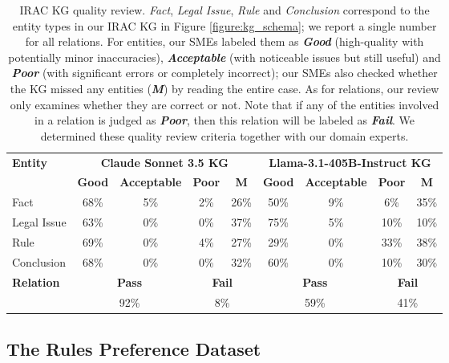 \begin{table}[ht]
  \centering
  \begin{tabular}{l|cccc|cccc}
    \hline
   \multirow{2}{*}{\textbf{Entity}} & \multicolumn{4}{c|}{\textbf{Claude Sonnet 3.5 KG}} & \multicolumn{4}{c}{\textbf{Llama-3.1-405B-Instruct KG}} \\
    & \textbf{Good} & \textbf{Acceptable} & \textbf{Poor} & \textbf{M} & \textbf{Good} & \textbf{Acceptable} & \textbf{Poor} & \textbf{M} \\
    \hline
    Fact & 68\% & 5\% & 2\% & 26\% & 50\% & 9\% & 6\% & 35\% \\ \hline
    Legal Issue & 63\% & 0\% & 0\% & 37\% & 75\% & 5\% & 10\% & 10\% \\ \hline
    Rule & 69\% & 0\% & 4\% & 27\% & 29\% & 0\%& 33\% & 38\% \\ \hline
    Conclusion & 68\% & 0\% & 0\% & 32\% & 60\% & 0\% & 10\% & 30\% \\ \hline \hline
    \multirow{2}{*}{\textbf{Relation}} & \multicolumn{2}{c}{\textbf{Pass}} & \multicolumn{2}{c|}{\textbf{Fail}} & \multicolumn{2}{c}{\textbf{Pass}} & \multicolumn{2}{c}{\textbf{Fail}} \\
    & \multicolumn{2}{c}{92\%} & \multicolumn{2}{c|}{8\%} & \multicolumn{2}{c}{59\%} & \multicolumn{2}{c}{41\%} \\ \hline
  \end{tabular}
  \caption{\label{table:kg_quality_review}
    IRAC KG quality review. \textit{Fact}, \textit{Legal Issue}, \textit{Rule} and \textit{Conclusion} correspond to the entity types in our IRAC KG in Figure \ref{figure:kg_schema}; we report a single number for all relations. For entities, our SMEs labeled them as \textbf{\textit{Good}} (high-quality with potentially minor inaccuracies), \textbf{\textit{Acceptable}} (with noticeable issues but still useful) and \textbf{\textit{Poor}} (with significant errors or completely incorrect); our SMEs also checked whether the KG missed any entities (\textbf{\textit{M}}) by reading the entire case. As for relations, our review only examines whether they are correct or not. Note that if any of the entities involved in a relation is judged as \textbf{\textit{Poor}}, then this relation will be labeled as \textbf{\textit{Fail}}. We determined these quality review criteria together with our domain experts.
  }
\end{table}

\subsection{The Rules Preference Dataset}
\label{section:rules_dpo}

